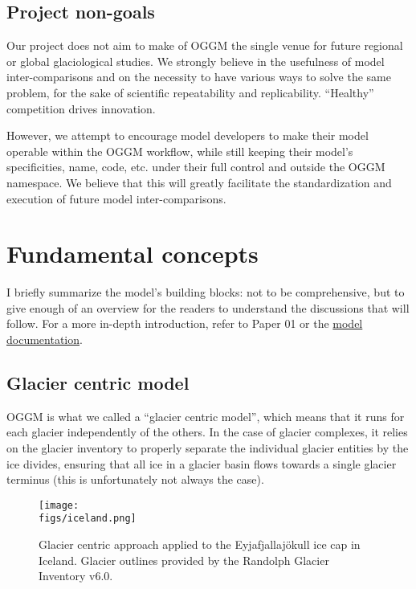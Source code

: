 \subsection*{Project non-goals}

Our project does not aim to make of OGGM the single venue for future regional or global glaciological studies. We
strongly believe in the usefulness of model inter-comparisons and on the necessity to have various ways to solve the
same problem, for the sake of scientific repeatability and replicability. “Healthy” competition drives innovation.

However, we attempt to encourage model developers to make their model operable within the OGGM workflow, while still
keeping their model’s specificities, name, code, etc. under their full control and outside the OGGM namespace. We
believe that this will greatly facilitate the standardization and execution of future model inter-comparisons.


\section{Fundamental concepts}

I briefly summarize the model’s building blocks: not to be comprehensive, but to give enough of an overview for the
readers to understand the discussions that will follow. For a more in-depth introduction, refer to
Paper 01 or the \href{http://docs.oggm.org}{model documentation}.


\subsection{Glacier centric model}


OGGM is what we called a “glacier centric model”, which means that it runs for each glacier independently of the
others. In the case of glacier complexes, it relies on the glacier inventory to properly separate the individual glacier
entities by the ice divides, ensuring that all ice in a glacier basin flows towards a single glacier terminus (this is
unfortunately not always the case).

\begin{figure}[h]
\centering
\texttt{[image: \\figs/iceland.png]}
\caption{Glacier centric approach applied to the Eyjafjallajökull ice cap in Iceland.  Glacier outlines provided by the Randolph Glacier Inventory v6.0.}
\end{figure}

